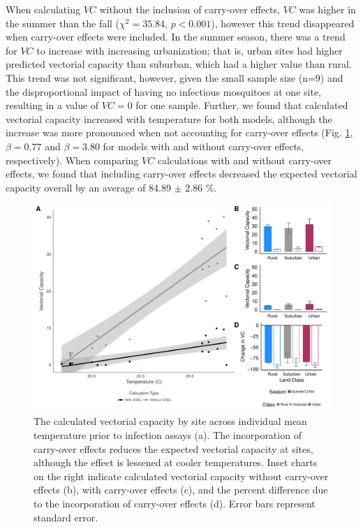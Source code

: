 \documentclass[12pt]{article}
\begin{document}
When calculating $VC$ without the inclusion of carry-over effects, $VC$ was  higher in the summer than the fall ($\chi^2=35.84$, $p<0.001$), however this trend disappeared when carry-over effects were included. In the summer season, there was a trend for $VC$ to increase with increasing urbanization; that is, urban sites had higher predicted vectorial capacity than suburban, which had a higher value than rural. This trend was not significant, however, given the small sample size (n=9) and the disproportional impact of having no infectious mosquitoes at one site, resulting in a value of $VC=0$ for one sample. Further, we found that calculated vectorial capacity increased with temperature for both models, although the increase was more pronounced when not accounting for carry-over effects (Fig. \ref{Fig:VC}, $\beta=0.77$ and $\beta=3.80$ for models with and without carry-over effects, respectively). When comparing $VC$ calculations with and without carry-over effects, we found that including carry-over effects decreased the expected vectorial capacity overall by an average of 84.89 $\pm$ 2.86 \%. 

\begin{figure}
\centering\includegraphics[width=0.9\linewidth]{VCPlot.pdf}
\caption{The calculated vectorial capacity by site across individual mean temperature prior to infection assays (a). The incorporation of carry-over effects reduces the expected vectorial capacity at sites, although the effect is lessened at cooler temperatures. Inset charts on the right indicate calculated vectorial capacity without carry-over effects (b), with carry-over effects (c), and the percent difference due to the incorporation of carry-over effects (d). Error bars represent standard error.
}
\label{Fig:VC}
\end{figure}
\end{document}
